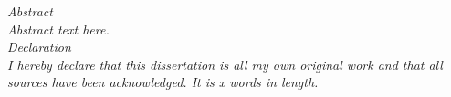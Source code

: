 \begin{center}
    \thispagestyle{empty}
    \huge{\textit{Abstract}}
    \\ \vspace{1cm}
    \small{\textit{ Abstract text here.}}
    \\ \vspace{5cm}
    \huge{\textit{Declaration}}
    \\ \vspace{1cm}
    \small{\textit{I hereby declare that this dissertation is all my own original work and that all sources have been acknowledged. It is x words in length.}}

\end{center}
